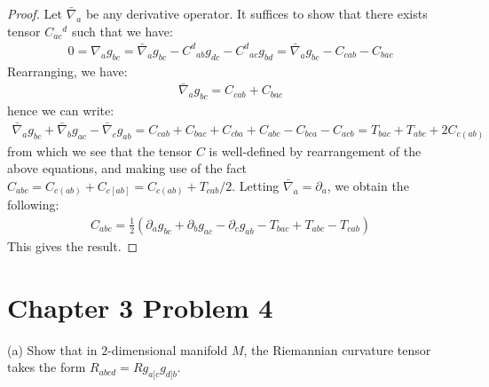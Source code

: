 \documentclass[11pt, onesided]{book}
\theoremstyle{break}
\theoremstyle{break}
\newcommand{\pd}{\partial}
\begin{document}
\begin{proof}
Let $\bar{\nabla}_a$ be any derivative operator. It suffices to show that there exists tensor $C_{ac}{}^d$ such that we have:
\begin{align*}
0 = \nabla_a g_{bc} = \bar{\nabla}_a g_{bc} - C^d{}_{ab}g_{dc} - C^d{}_{ac}g_{bd} = \bar{\nabla}_a g_{bc} - C_{cab} - C_{bac}
\end{align*}
Rearranging, we have:
\begin{align*}
\bar{\nabla}_a g_{bc} = C_{cab} + C_{bac}
\end{align*}
hence we can write:
\begin{align*}
\bar{\nabla}_a g_{bc} + \bar{\nabla}_bg_{ac} - \bar{\nabla}_cg_{ab} = C_{cab} + C_{bac} + C_{cba} + C_{abc} - C_{bca} - C_{acb} = T_{bac} + T_{abc} + 2C_{c(ab)}
\end{align*}
from which we see that the tensor $C$ is well-defined by rearrangement of the above equations, and making use of the fact $C_{abc} = C_{c(ab)} + C_{c[ab]} = C_{c(ab)} +T_{cab}/2$. Letting $\bar{\nabla}_a = \pd_a$, we obtain the following:
\begin{align*}
C_{abc} = \frac{1}{2}\left( \pd_a g_{bc} + \pd_b g_{ac} - \pd_c g_{ab} - T_{bac} + T_{abc} - T_{cab}\right)
\end{align*}
This gives the result.
\end{proof}


\newpage
\section{Chapter 3 Problem 4}
(a) Show that in $2$-dimensional manifold $M$, the Riemannian curvature tensor takes the form $R_{abcd} = Rg_{a[c}g_{d]b}$. 
\end{document}
